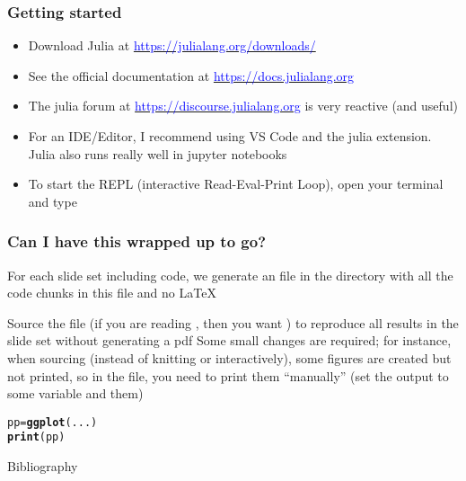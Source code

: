 \documentclass[aspectratio=169]{beamer}\usepackage[]{graphicx}\usepackage[]{xcolor}
\makeatletter
\newcommand{\hldef}[1]{\textcolor[rgb]{0.345,0.345,0.345}{#1}}%
\newcommand{\hlkwb}[1]{\textcolor[rgb]{0.69,0.353,0.396}{#1}}%
\newcommand{\hlkwd}[1]{\textcolor[rgb]{0.737,0.353,0.396}{\textbf{#1}}}%
\newenvironment{kframe}{%
 \def\at@end@of@kframe{}%
 \ifinner\ifhmode%
  \def\at@end@of@kframe{\end{minipage}}%
  \begin{minipage}{\columnwidth}%
 \fi\fi%
 \def\FrameCommand##1{\hskip\@totalleftmargin \hskip-\fboxsep
 \colorbox{shadecolor}{##1}\hskip-\fboxsep
     \hskip-\linewidth \hskip-\@totalleftmargin \hskip\columnwidth}%
 \MakeFramed {\advance\hsize-\width
   \@totalleftmargin\z@ \linewidth\hsize
   \@setminipage}}%
 {\par\unskip\endMakeFramed%
 \at@end@of@kframe}
\newenvironment{knitrout}{}{} %
\makeatother
\begin{document}
\begin{frame}
  \frametitle{Getting started}
  \begin{itemize}
    \item Download Julia at \href{https://julialang.org/downloads/}{\textcolor{blue}{https://julialang.org/downloads/}}
    \vfill
    \item See the official documentation at \href{https://docs.julialang.org}{\textcolor{blue}{https://docs.julialang.org}}
    \vfill
    \item The julia forum at \href{https://discourse.julialang.org}{\textcolor{blue}{https://discourse.julialang.org}} is very reactive (and useful)
    \vfill
    \item For an IDE/Editor, I recommend using VS Code and the julia extension. Julia also runs really well in jupyter notebooks
    \vfill
    \item To start the REPL (interactive Read-Eval-Print Loop), open your terminal and type 
  \end{itemize}
\end{frame}

\begin{frame}\frametitle{Can I have this wrapped up to go?}
For each slide set including  code, we generate an  file in the  directory with all the code chunks in this  file and no \LaTeX
\vfill

Source the file (if you are reading , then you want ) to reproduce all results in the slide set without generating a pdf
\vfill
Some small changes are required; for instance, when sourcing (instead of knitting or interactively), some figures are created but not printed, so in the  file, you need to print them ``manually'' (set the output to some variable and  them)
\vfill
\begin{knitrout}
\color{fgcolor}\begin{kframe}
\begin{alltt}
\hldef{pp} \hlkwb{=} \hlkwd{ggplot}\hldef{(...)}
\hlkwd{print}\hldef{(pp)}
\end{alltt}
\end{kframe}
\end{knitrout}
\end{frame}




\begin{frame}[allowframebreaks]{Bibliography}


\end{frame}
\end{document}
